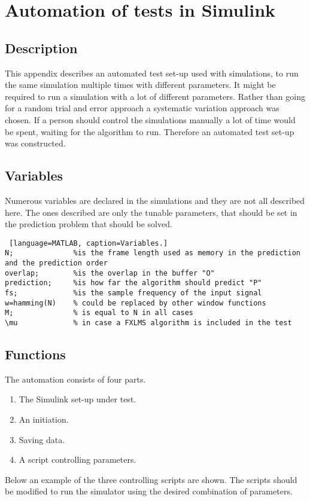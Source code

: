 \section{Automation of tests in Simulink} \label{sec:SimulinkAuto}
\subsection{Description}
This appendix describes an automated test set-up used with simulations, to run the same simulation multiple times with different parameters.
It might be required to run a simulation with a lot of different parameters. Rather than going for a random trial and error approach a systematic variation approach was chosen. If a person should control the simulations manually a lot of time would be spent, waiting for the algorithm to run. Therefore an automated test set-up was constructed. 

\subsection{Variables}
Numerous variables are declared in the simulations and they are not all described here. The ones described are only the tunable parameters, that should be set in the prediction problem that should be solved. 
\begin{lstlisting} [language=MATLAB, caption=Variables.]
N; 				%is the frame length used as memory in the prediction and the prediction order
overlap;		%is the overlap in the buffer "O"
prediction; 	%is how far the algorithm should predict "P"
fs; 			%is the sample frequency of the input signal 
w=hamming(N)	% could be replaced by other window functions
M;				% is equal to N in all cases
\mu 			% in case a FXLMS algorithm is included in the test
\end{lstlisting}

\subsection{Functions}
 The automation consists of four parts. 
\begin{enumerate}
	\item The Simulink set-up under test. 
	\item An initiation. 
	\item Saving data.
	\item A script controlling parameters. 
\end{enumerate}  

Below an example of the three controlling scripts are shown. The  scripts should be modified to run the simulator using the desired combination of parameters.

